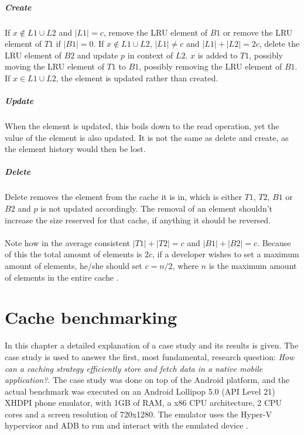 \documentclass[pdftex,a4paper,12pt,twoside]{report}
\begin{document}
\paragraph{Create} If $x \not \in L1 \cup L2$ and $\left\vert{L1}\right\vert = c$, remove the LRU element of $B1$ or remove the LRU element of $T1$ if $\left\vert{B1}\right\vert = 0$. If $x \not \in L1 \cup L2$, $\left\vert{L1}\right\vert \neq c$ and $\left\vert{L1}\right\vert + \left\vert{L2}\right\vert = 2c$, delete the LRU element of $B2$ and update $p$ in context of $L2$. $x$ is added to $T1$, possibly moving the LRU element of $T1$ to $B1$, possibly removing the LRU element of $B1$. If $x \in L1 \cup L2$, the element is updated rather than created.
\paragraph{Update} When the element is updated, this boils down to the read operation, yet the value of the element is also updated. It is not the same as delete and create, as the element history would then be lost.
\paragraph{Delete} Delete removes the element from the cache it is in, which is either $T1$, $T2$, $B1$ or $B2$ and $p$ is not updated accordingly. The removal of an element shouldn't increase the size reserved for that cache, if anything it should be reversed.
\\\\
Note how in the average consistent $\left\vert{T1}\right\vert + \left\vert{T2}\right\vert = c$ and $\left\vert{B1}\right\vert + \left\vert{B2}\right\vert = c$. Because of this the total amount of elements is $2c$, if a developer wishes to set a maximum amount of elements, he/she should set $c = n / 2$, where $n$ is the maximum amount of elements in the entire cache \citep{megiddo2004outperforming}.
\chapter{Cache benchmarking}
In this chapter a detailed explanation of a case study and its results is given. The case study is used to answer the first, most fundamental, research question: \emph{How can a caching strategy efficiently store and fetch data in a native mobile application?}.
The case study was done on top of the Android platform, and the actual benchmark was executed on an Android Lollipop 5.0 (API Level 21) XHDPI phone emulator, with 1GB of RAM, a x86 CPU architecture, 2 CPU cores and a screen resolution of 720x1280. The emulator uses the Hyper-V hypervisor and ADB to run and interact with the emulated device \citep{visual_studio_emulator}.
\end{document}
